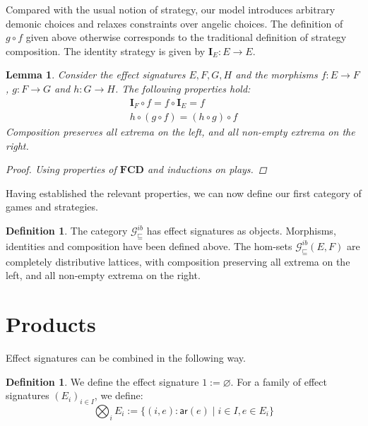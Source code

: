 \documentclass[11pt,oneside,draft]{book}
\newtheorem{lemma}[theorem]{Lemma}
\theoremstyle{definition}
\newtheorem{definition}[theorem]{Definition}
\newcommand{\gcat}{\mathcal{G}_{\sqsubseteq}}
\newcommand{\kw}[1]{\ensuremath{ \mathsf{#1} }}
\begin{document}
Compared with the usual notion of strategy,
our model introduces arbitrary demonic choices and
relaxes constraints over angelic choices.
The definition of $g \circ f$ given above
otherwise corresponds to the traditional
definition of strategy composition.
The identity strategy is given by $\mathbf{I}_E : E \rightarrow E$.

\begin{lemma}
Consider the effect signatures $E, F, G, H$ and
the morphisms
$f : E \rightarrow F$,
$g : F \rightarrow G$ and
$h : G \rightarrow H$.
The following properties hold:
\begin{gather*}
  \mathbf{I}_F \circ f = f \circ \mathbf{I}_E = f \\
  h \circ (g \circ f) = (h \circ g) \circ f
\end{gather*}
Composition preserves all extrema on the left,
and all non-empty extrema on the right.
\begin{proof}
Using properties of $\mathbf{FCD}$
and inductions on plays.
\end{proof}
\end{lemma}

Having established the relevant properties,
we can now define our first category of games and strategies.

\begin{definition}
The category $\gcat^{ib}$ has effect signatures as objects.
Morphisms, identities and composition have been defined above.
The hom-sets $\gcat^{ib}(E, F)$
are completely distributive lattices,
with composition preserving all extrema on the left,
and all non-empty extrema on the right.
\end{definition}


\section{Products} %

Effect signatures can be combined in the following way.

\begin{definition}
We define the effect signature
$1 := \varnothing$.
For a family of effect signatures $(E_i)_{i \in I}$,
we define:
\[
  \bigotimes_i E_i := \{ (i, e) : \kw{ar}(e) \mid i \in I, e \in E_i \}
\]
\end{definition}
\end{document}
